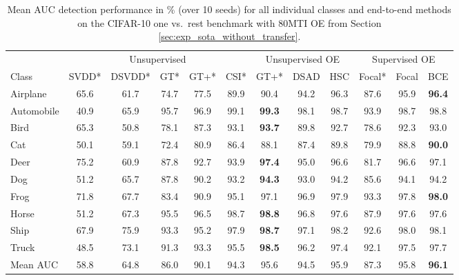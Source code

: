 \documentclass[10pt]{article} \usepackage[accepted]{stylefiles/tmlr}
\begin{document}
\begin{table*}[th]
    \caption{Mean AUC detection performance in \% (over 10 seeds) for all individual classes and end-to-end methods on the CIFAR-10 one vs.~rest benchmark with 80MTI OE from Section \ref{sec:exp_sota_without_transfer}.}
    \label{tab:cifar10_classes_wo_transfer}
    \vspace{0.5em}
    \centering\small
    \begin{tabular}{lccccccccccc} 
\toprule 
 & \multicolumn{5}{c|}{Unsupervised} & \multicolumn{3}{c|}{Unsupervised OE} & \multicolumn{3}{c}{Supervised OE} \\ 
Class & SVDD* & DSVDD* & GT* & GT+* & \multicolumn{1}{c|}{CSI*} & GT+* & DSAD & \multicolumn{1}{c|}{HSC} & Focal* & Focal & \multicolumn{1}{c}{BCE} \\ 
\midrule 
Airplane & 65.6 & 61.7 & 74.7 & 77.5 & \multicolumn{1}{c|}{89.9} & 90.4 & 94.2 & \multicolumn{1}{c|}{96.3} & 87.6 & 95.9 & \multicolumn{1}{c}{\bf 96.4} \\ 
Automobile & 40.9 & 65.9 & 95.7 & 96.9 & \multicolumn{1}{c|}{99.1} & \bf 99.3 & 98.1 & \multicolumn{1}{c|}{98.7} & 93.9 & 98.7 & \multicolumn{1}{c}{98.8} \\ 
Bird & 65.3 & 50.8 & 78.1 & 87.3 & \multicolumn{1}{c|}{93.1} & \bf 93.7 & 89.8 & \multicolumn{1}{c|}{92.7} & 78.6 & 92.3 & \multicolumn{1}{c}{93.0} \\ 
Cat & 50.1 & 59.1 & 72.4 & 80.9 & \multicolumn{1}{c|}{86.4} & 88.1 & 87.4 & \multicolumn{1}{c|}{89.8} & 79.9 & 88.8 & \multicolumn{1}{c}{\bf 90.0} \\ 
Deer & 75.2 & 60.9 & 87.8 & 92.7 & \multicolumn{1}{c|}{93.9} & \bf 97.4 & 95.0 & \multicolumn{1}{c|}{96.6} & 81.7 & 96.6 & \multicolumn{1}{c}{97.1} \\ 
Dog & 51.2 & 65.7 & 87.8 & 90.2 & \multicolumn{1}{c|}{93.2} & \bf 94.3 & 93.0 & \multicolumn{1}{c|}{94.2} & 85.6 & 94.1 & \multicolumn{1}{c}{94.2} \\ 
Frog & 71.8 & 67.7 & 83.4 & 90.9 & \multicolumn{1}{c|}{95.1} & 97.1 & 96.9 & \multicolumn{1}{c|}{97.9} & 93.3 & 97.8 & \multicolumn{1}{c}{\bf 98.0} \\ 
Horse & 51.2 & 67.3 & 95.5 & 96.5 & \multicolumn{1}{c|}{98.7} & \bf 98.8 & 96.8 & \multicolumn{1}{c|}{97.6} & 87.9 & 97.6 & \multicolumn{1}{c}{97.6} \\ 
Ship & 67.9 & 75.9 & 93.3 & 95.2 & \multicolumn{1}{c|}{97.9} & \bf 98.7 & 97.1 & \multicolumn{1}{c|}{98.2} & 92.6 & 98.0 & \multicolumn{1}{c}{98.1} \\ 
Truck & 48.5 & 73.1 & 91.3 & 93.3 & \multicolumn{1}{c|}{95.5} & \bf 98.5 & 96.2 & \multicolumn{1}{c|}{97.4} & 92.1 & 97.5 & \multicolumn{1}{c}{97.7} \\ 
\midrule 
Mean AUC & 58.8 & 64.8 & 86.0 & 90.1 & \multicolumn{1}{c|}{94.3} & 95.6 & 94.5 & \multicolumn{1}{c|}{95.9} & 87.3 & 95.8 & \multicolumn{1}{c}{\bf 96.1} \\ 
\bottomrule 
\end{tabular}  \end{table*}
\end{document}
